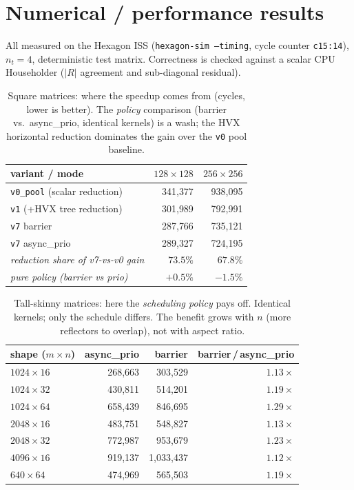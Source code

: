 \documentclass[11pt]{article}
\newcommand{\code}[1]{\texttt{\small #1}}
\begin{document}
\section{Numerical / performance results}
All measured on the Hexagon ISS (\code{hexagon-sim --timing}, cycle counter
\code{c15:14}), $n_t{=}4$, deterministic test matrix. Correctness is checked against a
scalar CPU Householder ($\lvert R\rvert$ agreement and sub-diagonal residual).

\begin{table}[h]
\centering
\caption{Square matrices: where the speedup comes from (cycles, lower is better).
The \emph{policy} comparison (barrier vs.\ async\_prio, identical kernels) is a wash;
the HVX horizontal reduction dominates the gain over the \code{v0} pool baseline.}
\begin{tabular}{lrr}
\toprule
variant / mode & $128\times128$ & $256\times256$ \\
\midrule
\code{v0\_pool} (scalar reduction) & 341{,}377 & 938{,}095 \\
\code{v1} (+HVX tree reduction)    & 301{,}989 & 792{,}991 \\
\code{v7} barrier                   & 287{,}766 & 735{,}121 \\
\code{v7} async\_prio               & 289{,}327 & 724{,}195 \\
\midrule
\textit{reduction share of v7-vs-v0 gain} & $73.5\%$ & $67.8\%$ \\
\textit{pure policy (barrier vs prio)}    & $+0.5\%$ & $-1.5\%$ \\
\bottomrule
\end{tabular}
\end{table}

\begin{table}[h]
\centering
\caption{Tall-skinny matrices: here the \emph{scheduling policy} pays off. Identical
kernels; only the schedule differs. The benefit grows with $n$ (more reflectors to
overlap), not with aspect ratio.}
\begin{tabular}{lrrr}
\toprule
shape ($m\times n$) & async\_prio & barrier & barrier\,/\,async\_prio \\
\midrule
$1024\times16$ & 268{,}663 & 303{,}529 & $1.13\times$ \\
$1024\times32$ & 430{,}811 & 514{,}201 & $1.19\times$ \\
$1024\times64$ & 658{,}439 & 846{,}695 & $\mathbf{1.29\times}$ \\
$2048\times16$ & 483{,}751 & 548{,}827 & $1.13\times$ \\
$2048\times32$ & 772{,}987 & 953{,}679 & $1.23\times$ \\
$4096\times16$ & 919{,}137 & 1{,}033{,}437 & $1.12\times$ \\
$640\times64$  & 474{,}969 & 565{,}503 & $1.19\times$ \\
\bottomrule
\end{tabular}
\end{table}
\end{document}
